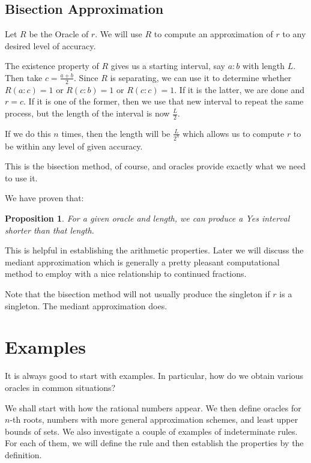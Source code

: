 \documentclass[12pt]{article}
\newtheorem{proposition}{Proposition}
\theoremstyle{remark}
\begin{document}
\subsection{Bisection Approximation}

Let $R$ be the Oracle of $r$. We will use $R$ to compute an approximation of $r$ to any desired level of accuracy. 

The existence property of $R$ gives us a starting interval, say $a:b$ with length $L$. Then take $c = \frac{a+b}{2}$. Since $R$ is separating, we can use it to determine whether $R(a:c) = 1$ or $R(c:b) = 1$ or $R(c:c) = 1$. If it is the latter, we are done and $r = c$. If it is one of the former, then we use that new interval to repeat the same process, but the length of the interval is now $\frac{L}{2}$. 

If we do this $n$ times, then the length will be $\frac{L}{2^n}$ which allows us to compute $r$ to be within any level of given accuracy. 

This is the bisection method, of course, and oracles provide exactly what we need to use it. 

We have proven that: 

\begin{proposition}\label{pr:short}
For a given oracle and length, we can produce a Yes interval shorter than that length. 
\end{proposition}

This is helpful in establishing the arithmetic properties. Later we will discuss the mediant approximation which is generally a pretty pleasant computational method to employ with a nice relationship to continued fractions. 

Note that the bisection method will not usually produce the singleton if $r$ is a singleton. The mediant approximation does. 

\section{Examples}

It is always good to start with examples. In particular, how do we obtain various oracles in common situations? 

We shall start with how the rational numbers appear. We then define oracles for $n$-th roots,  numbers with more general approximation schemes, and least upper bounds of sets. We also investigate a couple of examples of indeterminate rules. For each of them, we will define the rule and then establish the properties by the definition. 
\end{document}
